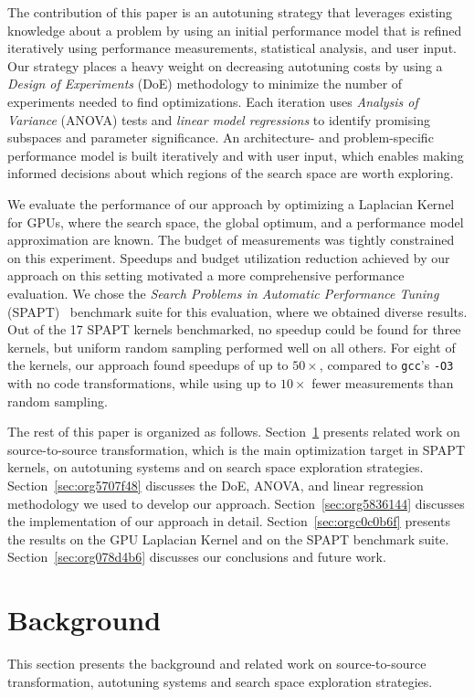 \documentclass[conference]{IEEEtran}
\begin{document}
The contribution of this paper is an autotuning strategy that leverages existing
knowledge about a problem by using an initial performance model that is refined
iteratively using performance measurements, statistical analysis, and user
input. Our strategy places a heavy weight on decreasing autotuning costs by
using a \emph{Design of Experiments} (DoE) methodology to minimize the number of
experiments needed to find optimizations. Each iteration uses \emph{Analysis of
Variance} (ANOVA) tests and \emph{linear model regressions} to identify promising
subspaces and parameter significance. An architecture- and problem-specific
performance model is built iteratively and with user input, which enables making
informed decisions about which regions of the search space are worth exploring.

We evaluate the performance of our approach by optimizing a Laplacian Kernel for
GPUs, where the search space, the global optimum, and a performance model
approximation are known. The budget of measurements was tightly constrained on
this experiment. Speedups and budget utilization reduction achieved by our
approach on this setting motivated a more comprehensive performance evaluation.
We chose the \emph{Search Problems in Automatic Performance Tuning}
(SPAPT)~\cite{balaprakash2012spapt} benchmark suite for this evaluation,
where we obtained diverse results. Out of the 17 SPAPT kernels benchmarked, no
speedup could be found for three kernels, but uniform random sampling performed
well on all others. For eight of the kernels, our approach found speedups of up
to \(50\times\), compared to \texttt{gcc}'s \texttt{-O3} with no code transformations, while
using up to \(10\times\) fewer measurements than random sampling.

The rest of this paper is organized as follows. Section~\ref{sec:orgea46544}
presents related work on source-to-source transformation, which is the main
optimization target in SPAPT kernels, on autotuning systems and on search space
exploration strategies. Section~\ref{sec:org5707f48} discusses the DoE,
ANOVA, and linear regression methodology we used to develop our approach.
Section~\ref{sec:org5836144} discusses the implementation
of our approach in detail. Section~\ref{sec:orgc0c0b6f} presents the
results on the GPU Laplacian Kernel and on the SPAPT benchmark suite.
Section~\ref{sec:org078d4b6} discusses our conclusions and future work.
\section{Background}
\label{sec:orgea46544}
This section presents the background and related work on source-to-source
transformation, autotuning systems and search space exploration strategies.
\end{document}
